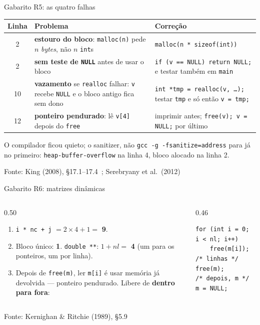\documentclass[aspectratio=169]{beamer}
\newcommand{\fonte}[1]{\vfill\hfill{\scriptsize\textcolor{UFSGray}{Fonte: #1}}}
\begin{document}
\begin{frame}{Gabarito R5: as quatro falhas}
  \scriptsize
  \begin{tabular}{@{}c>{\raggedright\arraybackslash}p{5.9cm}>{\raggedright\arraybackslash}p{5.6cm}@{}}
    \toprule
    Linha & Problema & Correção \\
    \midrule
    2 & \textbf{estouro do bloco}: \texttt{malloc(n)} pede $n$ \emph{bytes},
      não $n$ \texttt{int}s
      & \texttt{malloc(n * sizeof(int))} \\
    2 & \textbf{sem teste de \texttt{NULL}} antes de usar o bloco
      & \texttt{if (v == NULL) return NULL;} e testar também em \texttt{main} \\
    10 & \textbf{vazamento} se \texttt{realloc} falhar: \texttt{v} recebe
      \texttt{NULL} e o bloco antigo fica sem dono
      & \texttt{int *tmp = realloc(v, \ldots);} testar \texttt{tmp} e só
      então \texttt{v = tmp;} \\
    12 & \textbf{ponteiro pendurado}: lê \texttt{v[4]} depois do \texttt{free}
      & imprimir antes; \texttt{free(v); v = NULL;} por último \\
    \bottomrule
  \end{tabular}
  \begin{block}{O compilador ficou quieto; o sanitizer, não}
    \small \texttt{gcc -g -fsanitize=address} para já no primeiro:
    \texttt{heap-buffer-overflow} na linha 4, bloco alocado na linha 2.
  \end{block}
  \fonte{King (2008), §17.1--17.4~\cite{king2008c}; Serebryany et al.\ (2012)~\cite{serebryany2012asan}}
\end{frame}

\begin{frame}[fragile]{Gabarito R6: matrizes dinâmicas}
  \begin{columns}[T]
    \begin{column}{0.50\textwidth}
      \small
      \begin{enumerate}
        \item[(a)] \texttt{i * nc + j} $= 2 \times 4 + 1 =$ \textbf{9}.
        \item[(b)] Bloco único: \textbf{1}. \texttt{double **}: $1 + nl =$
          \textbf{4} (um para os ponteiros, um por linha).
        \item[(c)] Depois de \texttt{free(m)}, ler \texttt{m[i]} é usar
          memória já devolvida --- ponteiro pendurado. Libere de
          \textbf{dentro para fora}:
      \end{enumerate}
    \end{column}
    \begin{column}{0.46\textwidth}
\begin{lstlisting}[style=numC]
for (int i = 0; i < nl; i++)
    free(m[i]);   /* linhas */
free(m);          /* depois, m */
m = NULL;
\end{lstlisting}
    \end{column}
  \end{columns}
  \fonte{Kernighan \& Ritchie (1989), §5.9~\cite{kernighan1989c}}
\end{frame}
\end{document}
